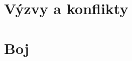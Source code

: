 \documentclass[../main.tex]{subfiles}
\begin{document}
\section{Výzvy a konflikty}
\label{sec:vyzvykonflikty}

\section{Boj}
\label{sec:boj}
\end{document}
